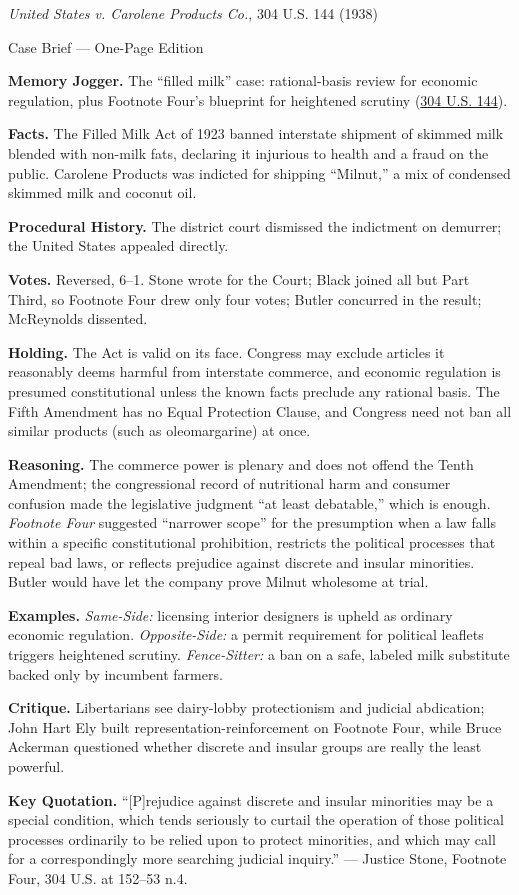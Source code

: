 \documentclass[12pt]{article}
\begin{document}
\begin{center}
{\Large \textit{United States v. Carolene Products Co.}, 304 U.S. 144 (1938)\par}
\vspace{0.3em}
{\normalsize Case Brief --- One-Page Edition\par}
\end{center}

\textbf{Memory Jogger.} The ``filled milk'' case: rational-basis review for economic regulation, plus Footnote Four's blueprint for heightened scrutiny (\href{https://supreme.justia.com/cases/federal/us/304/144/}{304 U.S. 144}).

\textbf{Facts.} The Filled Milk Act of 1923 banned interstate shipment of skimmed milk blended with non-milk fats, declaring it injurious to health and a fraud on the public. Carolene Products was indicted for shipping ``Milnut,'' a mix of condensed skimmed milk and coconut oil.

\textbf{Procedural History.} The district court dismissed the indictment on demurrer; the United States appealed directly.

\textbf{Votes.} Reversed, 6--1. Stone wrote for the Court; Black joined all but Part Third, so Footnote Four drew only four votes; Butler concurred in the result; McReynolds dissented.

\textbf{Holding.} The Act is valid on its face. Congress may exclude articles it reasonably deems harmful from interstate commerce, and economic regulation is presumed constitutional unless the known facts preclude any rational basis. The Fifth Amendment has no Equal Protection Clause, and Congress need not ban all similar products (such as oleomargarine) at once.

\textbf{Reasoning.} The commerce power is plenary and does not offend the Tenth Amendment; the congressional record of nutritional harm and consumer confusion made the legislative judgment ``at least debatable,'' which is enough. \emph{Footnote Four} suggested ``narrower scope'' for the presumption when a law falls within a specific constitutional prohibition, restricts the political processes that repeal bad laws, or reflects prejudice against discrete and insular minorities. Butler would have let the company prove Milnut wholesome at trial.

\textbf{Examples.} \emph{Same-Side:} licensing interior designers is upheld as ordinary economic regulation. \emph{Opposite-Side:} a permit requirement for political leaflets triggers heightened scrutiny. \emph{Fence-Sitter:} a ban on a safe, labeled milk substitute backed only by incumbent farmers.

\textbf{Critique.} Libertarians see dairy-lobby protectionism and judicial abdication; John Hart Ely built representation-reinforcement on Footnote Four, while Bruce Ackerman questioned whether discrete and insular groups are really the least powerful.

\textbf{Key Quotation.} ``[P]rejudice against discrete and insular minorities may be a special condition, which tends seriously to curtail the operation of those political processes ordinarily to be relied upon to protect minorities, and which may call for a correspondingly more searching judicial inquiry.'' --- Justice Stone, Footnote Four, 304 U.S. at 152--53 n.4.
\end{document}

